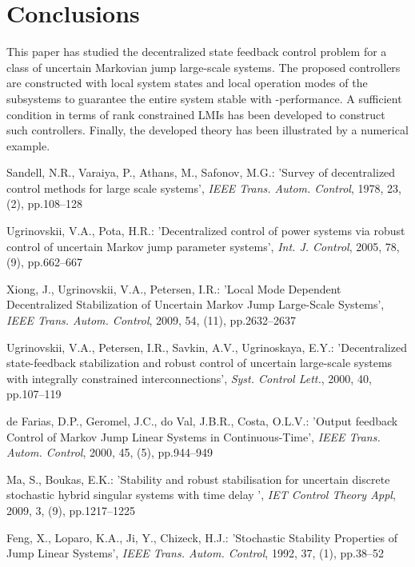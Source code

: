 \documentclass[11pt,draftcls,onecolumn]{IEEEtran}
\begin{document}
\section{Conclusions}

This paper has studied the decentralized state feedback  control problem  for a class of uncertain Markovian jump large-scale systems. The proposed controllers are constructed with local system states and local operation modes of the subsystems to guarantee the entire system  stable with -performance.  A sufficient condition in terms of rank constrained LMIs has been developed to construct such controllers. Finally, the developed theory has been illustrated by a numerical example.

\begin{thebibliography}{0}
Sandell, N.R., Varaiya, P., Athans, M., Safonov, M.G.: 'Survey of decentralized control methods for large scale systems', \emph{IEEE Trans. Autom. Control}, 1978, 23, (2), pp.108--128

Ugrinovskii, V.A., Pota, H.R.: 'Decentralized control of power systems via robust control of uncertain Markov jump parameter systems', \emph{Int. J. Control}, 2005, 78, (9), pp.662--667

Xiong, J., Ugrinovskii, V.A., Petersen, I.R.: 'Local Mode Dependent Decentralized Stabilization of Uncertain Markov Jump Large-Scale Systems', \emph{IEEE Trans. Autom. Control}, 2009, 54, (11), pp.2632--2637

Ugrinovskii, V.A., Petersen, I.R., Savkin, A.V., Ugrinoskaya, E.Y.: 'Decentralized state-feedback stabilization and robust control of uncertain large-scale systems with integrally constrained interconnections', \emph{Syst. Control Lett.}, 2000, 40, pp.107--119



de Farias, D.P., Geromel, J.C., do Val, J.B.R., Costa, O.L.V.: 'Output feedback Control of Markov Jump Linear Systems in Continuous-Time', \emph{IEEE Trans. Autom. Control}, 2000, 45, (5), pp.944--949


Ma, S., Boukas, E.K.: 'Stability and robust stabilisation for uncertain discrete stochastic hybrid singular systems with time delay
', \emph{IET Control Theory Appl}, 2009, 3, (9), pp.1217--1225

Feng, X., Loparo, K.A., Ji, Y.,  Chizeck, H.J.: 'Stochastic Stability Properties of Jump Linear Systems', \emph{IEEE Trans. Autom. Control}, 1992, 37, (1), pp.38--52


\end{thebibliography}
\end{document}
